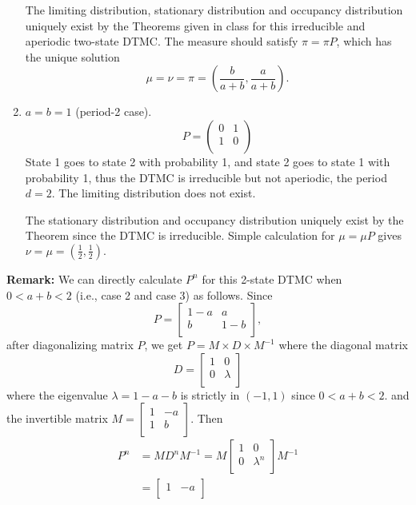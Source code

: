 \documentclass[  11pt]{article}
\begin{document}
\begin{ExerciseList}
\begin{enumerate}
The limiting distribution, stationary distribution and occupancy distribution uniquely exist by the Theorems given in class for this irreducible and aperiodic two-state DTMC.
The measure should satisfy $\pi=\pi P$, which has the unique solution
\[
\mu=\nu=\pi=(\frac{b}{a+b},\frac{a}{a+b}).
\]


\item 
$a= b=1$ (period-2 case).
\[
P=\left(\begin{array}{cc}
0 &1\\
1 &0\\
\end{array}\right)
\]
State 1 goes to state 2 with probability 1, and state 2 goes to state 1 with probability 1, thus the DTMC is irreducible but not aperiodic, the period $d=2$.
The limiting distribution does not exist.\par
The stationary distribution and occupancy distribution uniquely exist
by the Theorem since the DTMC is irreducible. 
Simple calculation for $\mu=\mu P$ gives 
$
\nu=\mu=(\frac{1}{2},\frac{1}{2}).
$
\end{enumerate}
\bigskip
{\bf Remark:}
We can directly calculate $P^n$  for this 2-state DTMC when $0<a+b<2$
(i.e., case 2 and case 3) as follows.
Since 
\[
P=\left[\begin{array}{cc}
1-a &a\\
b &1-b\\
\end{array}\right],
\]
after diagonalizing matrix $P$, we get $P = M\times D\times M^{-1}$ 
where the diagonal matrix   \[ D = \begin{bmatrix}
1 & 0 \\
0 & \lambda \\
\end{bmatrix}\]  where the eigenvalue $\lambda = 1-a-b$  is strictly in $(-1,1)$ since $0<a+b<2$.
 and the invertible matrix  $M = \begin{bmatrix}
1 & -a \\
1 & b \\
\end{bmatrix}$. Then 
\[\begin{split}
P^{n} & = MD^nM^{-1}= M \begin{bmatrix}
1 & 0 \\
0 & \lambda^n \\
\end{bmatrix}M^{-1} \\
& = \begin{bmatrix}
1 & -a \\

\end{bmatrix}
\end{split}\]
\end{ExerciseList}
\end{document}
